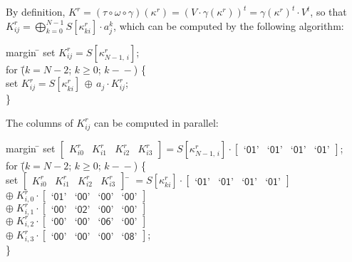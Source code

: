 \documentclass{llncs}
\newcommand{\gf}[1]{\textsf{`#1'}}
\begin{document}
By definition, $K^r = (\tau \circ \omega \circ \gamma)(\kappa^r)
= (V \cdot \gamma(\kappa^r))^t = \gamma(\kappa^r)^t \cdot V^t$, so
that $K^r_{ij} = \bigoplus_{k=0}^{N-1}{S[\kappa^r_{ki}] \cdot
a_j^k}$, which can be computed by the following algorithm:
\begin{tabbing}margin \= \kill
    \> set $K^r_{ij} = S[\kappa^r_{N-1,\,i}]$; \\
    \> for \= ($k = N - 2$; $k \geqslant 0$; $k\!-\!\!-$) \{ \\
    \>     \> set $K^r_{ij} = S[\kappa^r_{ki}] \,\oplus\, a_j \!\cdot\! K^r_{ij}$; \\
    \> \}
\end{tabbing}
The columns of $K^r_{ij}$ can be computed in parallel:
\begin{tabbing}margin \= \kill %
    \> set $[\begin{array}{cccc}K^r_{i0} & K^r_{i1} & K^r_{i2} & K^r_{i3}\end{array}]
    = S[\kappa^r_{N-1,\,i}] \!\cdot\! [\begin{array}{cccc}\gf{01} & \gf{01} & \gf{01} & \gf{01}\end{array}]$; \\ %
    \> for \= ($k = N - 2$; $k \geqslant 0$; $k\!-\!\!-$) \{ \\ %
    \>     \> set $[\begin{array}{cccc}K^r_{i0} & K^r_{i1} & K^r_{i2} & K^r_{i3}\end{array}]$
    \= $= S[\kappa^r_{ki}] \!\cdot\! [\begin{array}{cccc}\gf{01}& \gf{01} & \gf{01} & \gf{01}\end{array}]$ \\ %
    \>     \>     \> $\oplus \; K^r_{i,0} \!\cdot\! [\begin{array}{cccc}\gf{01} & \gf{00} & \gf{00} & \gf{00}\end{array}]$ \\ %
    \>     \>     \> $\oplus \; K^r_{i,1} \!\cdot\! [\begin{array}{cccc}\gf{00} & \gf{02} & \gf{00} & \gf{00}\end{array}]$ \\ %
    \>     \>     \> $\oplus \; K^r_{i,2} \!\cdot\! [\begin{array}{cccc}\gf{00} & \gf{00} & \gf{06} & \gf{00}\end{array}]$ \\ %
    \>     \>     \> $\oplus \; K^r_{i,3} \!\cdot\! [\begin{array}{cccc}\gf{00} & \gf{00} & \gf{00} & \gf{08}\end{array}]$; \\ %
    \> \}
\end{tabbing}
\end{document}
